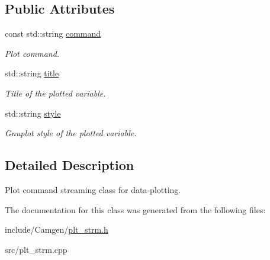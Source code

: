 \subsection*{Public Attributes}
\begin{DoxyCompactItemize}
\item 
\hypertarget{a00117_aa1c1d0322045902c0813999b6716bc5f}{const std\-::string \hyperlink{a00117_aa1c1d0322045902c0813999b6716bc5f}{command}}\label{a00117_aa1c1d0322045902c0813999b6716bc5f}

\begin{DoxyCompactList}\small\item\em Plot command. \end{DoxyCompactList}\item 
\hypertarget{a00117_ae5d24d01b312a2cbfce93a0edbb5de83}{std\-::string \hyperlink{a00117_ae5d24d01b312a2cbfce93a0edbb5de83}{title}}\label{a00117_ae5d24d01b312a2cbfce93a0edbb5de83}

\begin{DoxyCompactList}\small\item\em Title of the plotted variable. \end{DoxyCompactList}\item 
\hypertarget{a00117_a879cb4f17927d1fe3fa384b9ce878237}{std\-::string \hyperlink{a00117_a879cb4f17927d1fe3fa384b9ce878237}{style}}\label{a00117_a879cb4f17927d1fe3fa384b9ce878237}

\begin{DoxyCompactList}\small\item\em Gnuplot style of the plotted variable. \end{DoxyCompactList}\end{DoxyCompactItemize}


\subsection{Detailed Description}
Plot command streaming class for data-\/plotting. 

The documentation for this class was generated from the following files\-:\begin{DoxyCompactItemize}
\item 
include/\-Camgen/\hyperlink{a00700}{plt\-\_\-strm.\-h}\item 
src/plt\-\_\-strm.\-cpp\end{DoxyCompactItemize}
